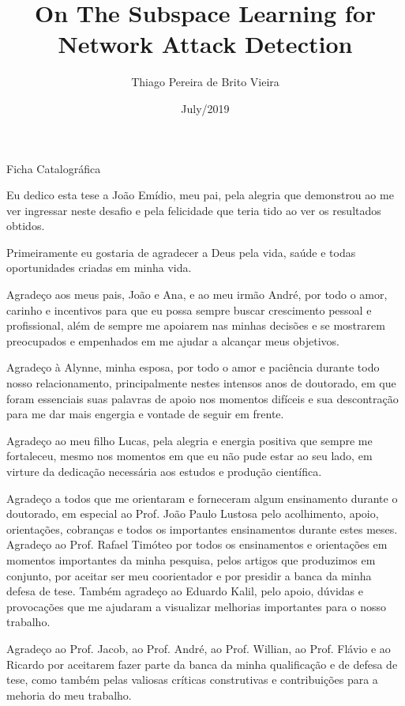 \documentclass[en, oneside, onehalfspacing]{risethesis}
\title{On The Subspace Learning for Network Attack Detection}
\date{July/2019}
\author{Thiago Pereira de Brito Vieira}
\begin{document}
\frontmatter
\frontpage
\presentationpage

\begin{dedicatory}Ficha Catalográfica\end{dedicatory}


\begin{dedicatory}Eu dedico esta tese a João Emídio, meu pai, pela alegria que demonstrou ao me ver ingressar neste desafio e pela felicidade que teria tido ao ver os resultados obtidos.\end{dedicatory}

\agradecimentos
Primeiramente eu gostaria de agradecer a Deus pela vida, saúde e todas oportunidades criadas em minha vida.

Agradeço aos meus pais, João e Ana, e ao meu irmão André, por todo o amor, carinho e incentivos para que eu possa sempre buscar crescimento pessoal e profissional, além de sempre me apoiarem nas minhas decisões e se mostrarem preocupados e empenhados em me ajudar a alcançar meus objetivos.

Agradeço à Alynne, minha esposa, por todo o amor e paciência durante todo nosso relacionamento, principalmente nestes intensos anos de doutorado, em que foram essenciais suas palavras de apoio nos momentos difíceis e sua descontração para me dar mais engergia e vontade de seguir em frente.

Agradeço ao meu filho Lucas, pela alegria e energia positiva que sempre me fortaleceu, mesmo nos momentos em que eu não pude estar ao seu lado, em virture da dedicação necessária aos estudos e produção científica.

Agradeço a todos que me orientaram e forneceram algum ensinamento durante o doutorado, em especial ao Prof. João Paulo Lustosa pelo acolhimento, apoio, orientações, cobranças e todos os importantes ensinamentos durante estes meses. Agradeço ao Prof. Rafael Timóteo por todos os ensinamentos e orientações em momentos importantes da minha pesquisa, pelos artigos que produzimos em conjunto, por aceitar ser meu coorientador e por presidir a banca da minha defesa de tese. Também agradeço ao Eduardo Kalil, pelo apoio, dúvidas e provocações que me ajudaram a visualizar melhorias importantes para o nosso trabalho.

Agradeço ao Prof. Jacob, ao Prof. André, ao Prof. Willian, ao Prof. Flávio e ao Ricardo por aceitarem fazer parte da banca da minha qualificação e de defesa de tese, como também pelas valiosas críticas construtivas e contribuições para a mehoria do meu trabalho.
\end{document}
